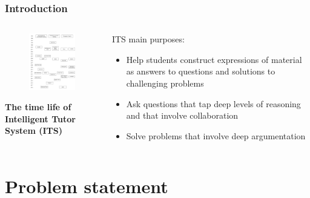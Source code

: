 \documentclass{beamer}
\begin{document}
\begin{frame}
\frametitle{Introduction}
\begin{columns}
	\begin{column}{.45\textwidth}
		\begin{figure}
			\includegraphics[width=45mm]{1.png}
		\end{figure}
\begin{center}
	{\tiny 		\textbf{The time life of Intelligent Tutor System (ITS)}}
\end{center}
	\end{column}
	
	\begin{column}{.55\textwidth}
	\begin{block}{ITS main purposes: }
		\begin{itemize}
			\item Help students construct expressions of material as answers to questions and solutions to challenging problems
			\item Ask questions that tap deep levels of reasoning and that involve collaboration
			\item Solve problems that involve deep argumentation
		\end{itemize} 
	\end{block}
		

	\end{column}
\end{columns}
\end{frame}




\section{Problem statement} %
\end{document}

